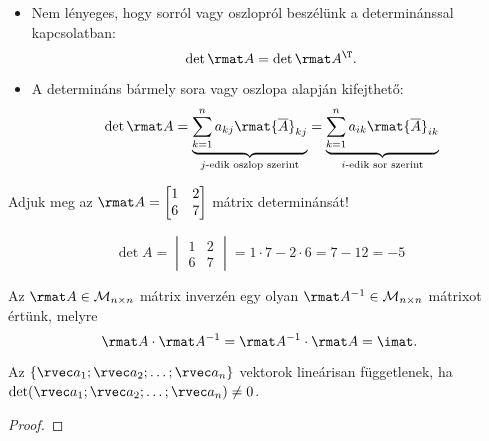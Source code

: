 \begin{note}
  \begin{itemize}
    \item Nem lényeges, hogy sorról vagy oszlopról beszélünk a determinánssal
          kapcsolatban:
          $$
            \det \rmat A = \det \rmat A^\T
            \text.
          $$

    \item A determináns bármely sora vagy oszlopa alapján kifejthető:
          $$
            \det \rmat A
            = \underbrace{
              \sum_{k = 1}^n a_{kj} \rmat{\overline A}_{kj}
            }_{\text{$j$-edik oszlop szerint}}
            = \underbrace{
              \sum_{k = 1}^n a_{ik} \rmat{\overline A}_{ik}
            }_{\text{$i$-edik sor szerint}}
          $$
  \end{itemize}
\end{note}

\begin{example}
  \bgroup\sffamily
  Adjuk meg az $\rmat A = \begin{bmatrix}
      1 & 2 \\ 6 & 7
    \end{bmatrix}$ mátrix determinánsát!
  \egroup

  \hdashrule[.8ex][x]{\dimexpr\textwidth}{1pt}{2mm 3pt}
  $$
    \det A = \begin{vmatrix}
      1 & 2 \\ 6 & 7
    \end{vmatrix} = 1 \cdot 7 - 2 \cdot 6 = 7 - 12 = -5
  $$
\end{example}

\begin{definition}
  Az $\rmat A \in \mathcal M_{n \times n}$ mátrix inverzén egy olyan
  $\rmat A^{-1} \in \mathcal M_{n \times n}$ mátrixot értünk, melyre
  $$
    \rmat A \cdot \rmat A^{-1} = \rmat A^{-1} \cdot \rmat A = \imat
    \text.
  $$
\end{definition}

\begin{theorem}
  Az $\{\rvec a_1; \rvec a_2; \ldots; \rvec a_n\}$ vektorok lineárisan
  függetlenek, ha $\det(\rvec a_1; \rvec a_2; \ldots; \rvec a_n) \neq 0$.

  \begin{proof}
    \vspace{10em}
  \end{proof}
\end{theorem}

